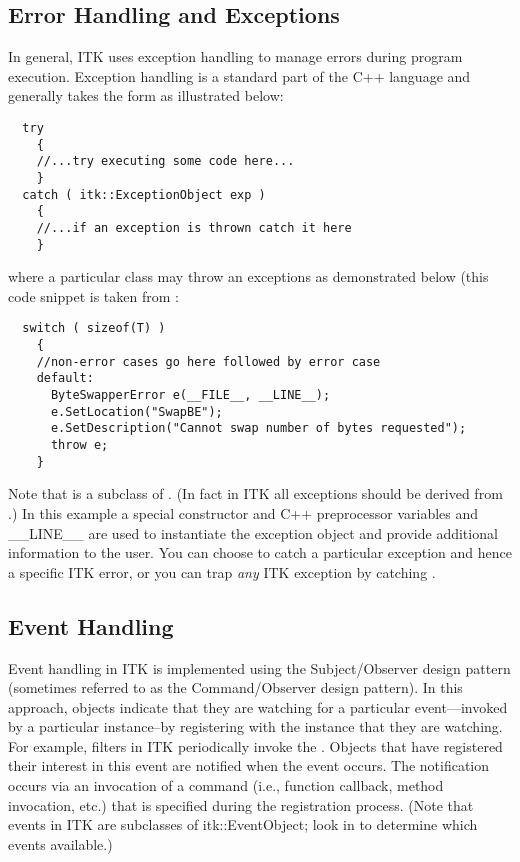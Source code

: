 \subsection{Error Handling and Exceptions}
\label{sec:ErrorHandling}


In general, ITK uses exception handling to manage errors during program
execution. Exception handling is a standard part of the C++ language and
generally takes the form as illustrated below:
\small
\begin{verbatim}
  try
    {
    //...try executing some code here...
    }
  catch ( itk::ExceptionObject exp )
    {
    //...if an exception is thrown catch it here
    }
\end{verbatim}
\normalsize

where a particular class may throw an exceptions as demonstrated below (this
code snippet is taken from :
\small
\begin{verbatim}
  switch ( sizeof(T) )
    {
    //non-error cases go here followed by error case  
    default:  
      ByteSwapperError e(__FILE__, __LINE__);
      e.SetLocation("SwapBE");
      e.SetDescription("Cannot swap number of bytes requested");
      throw e;
    }
\end{verbatim}
\normalsize

Note that  is a subclass of
. (In fact in ITK all exceptions should be derived
from .) In this example a special constructor and C++
preprocessor variables  and {__LINE__} are used to instantiate
the exception object and provide additional information to the user. You can
choose to catch a particular exception and hence a specific ITK error, or you
can trap \emph{any} ITK exception by catching .


\subsection{Event Handling}
\label{sec:EventHandling}


Event handling in ITK is implemented using the Subject/Observer design
pattern \cite{Gamma1995} (sometimes referred to as the Command/Observer
design pattern). In this approach, objects indicate that they are watching
for a particular event---invoked by a particular instance--by registering
with the instance that they are watching.  For example, filters in ITK
periodically invoke the . Objects that have registered
their interest in this event are notified when the event occurs. The
notification occurs via an invocation of a command (i.e., function callback,
method invocation, etc.) that is specified during the registration
process. (Note that events in ITK are subclasses of {itk::EventObject}; look
in  to determine which events available.)

